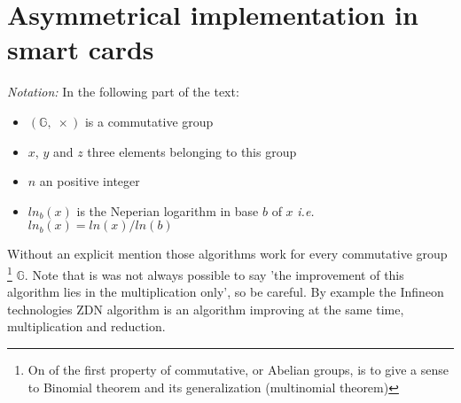 \newpage
\section{Asymmetrical implementation in smart cards}
\label{Asymmetrical_implementation_in_smart_cards}

\textit{Notation:}
In the following part of the text:
\begin{itemize}
	\item $( \mathbb{G},\; \times )$ is a commutative group
	\item $x$, $y$ and $z$ three elements belonging to this group
	\item $n$ an positive integer
	\item $ln_b(x)$ is the Neperian logarithm in base $b$ of $x$ 
		\textit{i.e.} $ln_b(x)= ln(x)/ln(b)$ 
\end{itemize}
Without an explicit mention those algorithms work for every commutative group
\footnote{On of the first property of commutative, or Abelian groups, is to give a sense to Binomial theorem and its generalization (multinomial theorem)} $ \mathbb{G} $.
Note that is was not always possible to say 'the improvement of this algorithm
lies in the multiplication only', so be careful. By example the Infineon technologies ZDN algorithm is an algorithm improving at the same time, multiplication and reduction.
\vspace{5mm}



		